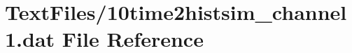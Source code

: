 \hypertarget{10time2histsim__channel1_8dat}{}\section{Text\+Files/10time2histsim\+\_\+channel1.dat File Reference}
\label{10time2histsim__channel1_8dat}
